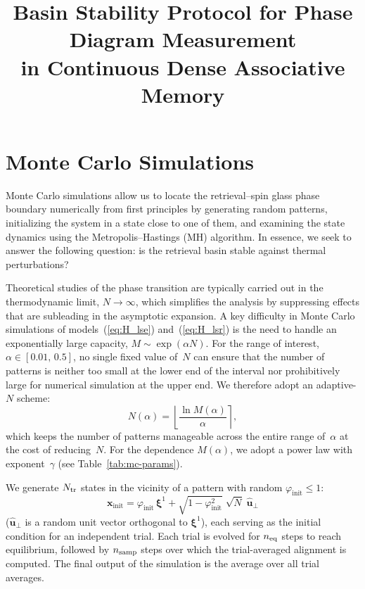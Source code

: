 \documentclass[11pt]{article}
\title{Basin Stability Protocol for Phase Diagram Measurement\\
       in Continuous Dense Associative Memory}
\author{}
\date{}
\begin{document}
\maketitle

\section{Monte Carlo Simulations}
\label{sec:mc}

Monte Carlo simulations allow us to locate the retrieval--spin glass phase boundary numerically from first principles by generating random patterns, initializing the system in a state close to one of them, and examining the state dynamics using the Metropolis--Hastings (MH) algorithm. In essence, we seek to answer the following question: is the retrieval basin stable against thermal perturbations?

Theoretical studies of the phase transition are typically carried out in the thermodynamic limit, $N\to\infty$, which simplifies the analysis by suppressing effects that are subleading in the asymptotic expansion. A key difficulty in Monte Carlo simulations of models~(\ref{eq:H_lse}) and~(\ref{eq:H_lsr}) is the need to handle an exponentially large capacity, $M \sim \exp(\alpha N)$. For the range of interest, $\alpha \in [0.01,\, 0.5]$, no single fixed value of~$N$ can ensure that the number of patterns is neither too small at the lower end of the interval nor prohibitively large for numerical simulation at the upper end. We therefore adopt an adaptive-$N$ scheme:
\begin{equation}
    N(\alpha) = \left\lfloor \frac{\ln M(\alpha)}{\alpha} \right\rceil,
\end{equation}
which keeps the number of patterns manageable across the entire range of~$\alpha$ at the cost of reducing~$N$.
For the dependence $M(\alpha)$, we adopt a power law with exponent~$\gamma$ (see Table~\ref{tab:mc-params}).

We generate $N_{\rm tr}$ states in the vicinity of a pattern with random $\varphi_{\mathrm{init}} \leq 1$:
\begin{equation}
    \mathbf{x}_{\mathrm{init}} = \varphi_{\mathrm{init}}\, \boldsymbol{\xi}^1
    + \sqrt{1 - \varphi_{\mathrm{init}}^2}\;\sqrt{N}\; \hat{\mathbf{u}}_\perp
\end{equation}
($\hat{\mathbf{u}}_\perp$ is a random unit vector orthogonal to $\boldsymbol{\xi}^1$), each serving as the initial condition for an independent trial. Each trial is evolved for $n_{\rm eq}$ steps to reach equilibrium, followed by $n_{\rm samp}$ steps over which the trial-averaged alignment is computed. The final output of the simulation is the average over all trial averages.
\end{document}
